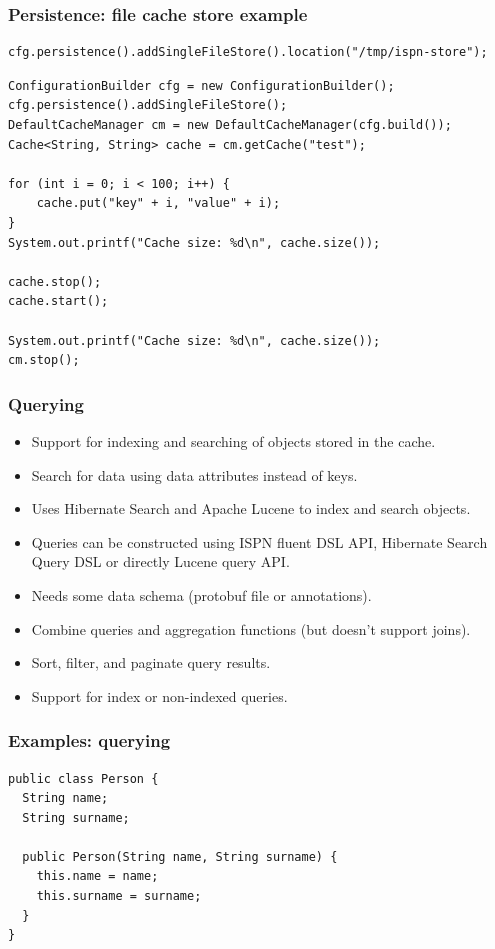 \documentclass[10pt,utf8]{beamer}
\begin{document}
\begin{frame}[fragile]
	\frametitle{Persistence: file cache store example}
	\begin{lstlisting}[style=Java]
cfg.persistence().addSingleFileStore().location("/tmp/ispn-store");
	\end{lstlisting}
	\begin{lstlisting}[style=Java]
ConfigurationBuilder cfg = new ConfigurationBuilder();
cfg.persistence().addSingleFileStore();
DefaultCacheManager cm = new DefaultCacheManager(cfg.build());
Cache<String, String> cache = cm.getCache("test");
        
for (int i = 0; i < 100; i++) {
    cache.put("key" + i, "value" + i);
}
System.out.printf("Cache size: %d\n", cache.size());
        
cache.stop();
cache.start();
        
System.out.printf("Cache size: %d\n", cache.size());
cm.stop();  
	\end{lstlisting}
\end{frame}

\begin{frame}
	\frametitle{Querying}
	\begin{itemize}
		\item Support for indexing and searching of objects stored in the cache.
		\pause
		\item Search for data using data attributes instead of keys.
		\pause
		\item Uses Hibernate Search and Apache Lucene to index and search objects.
		\pause
		\item Queries can be constructed using ISPN fluent DSL API, Hibernate Search Query DSL or directly Lucene query API.
		\pause
		\item Needs some data schema (protobuf file or annotations).
		\pause
		\item Combine queries and aggregation functions (but doesn't support joins).
		\pause
		\item Sort, filter, and paginate query results.
		\pause
		\item Support for index or non-indexed queries.
	\end{itemize}
\end{frame}

\begin{frame}[fragile]
	\frametitle{Examples: querying}
	\begin{lstlisting}[style=Java]
public class Person {
  String name;
  String surname;
	
  public Person(String name, String surname) {
    this.name = name;
    this.surname = surname;
  }
}
	\end{lstlisting}
\end{frame}
\end{document}
